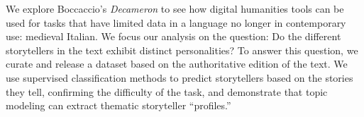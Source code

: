 We explore Boccaccio's \emph{Decameron} to see how digital humanities tools can be used for tasks that have limited data in a language no longer in contemporary use: medieval Italian. We focus our analysis on the question: Do the different storytellers in the text exhibit distinct personalities? To answer this question, we curate and release a dataset based on the authoritative edition of the text. We use supervised classification methods to predict storytellers based on the stories they tell, confirming the difficulty of the task, and demonstrate that topic modeling can extract thematic storyteller ``profiles.''
